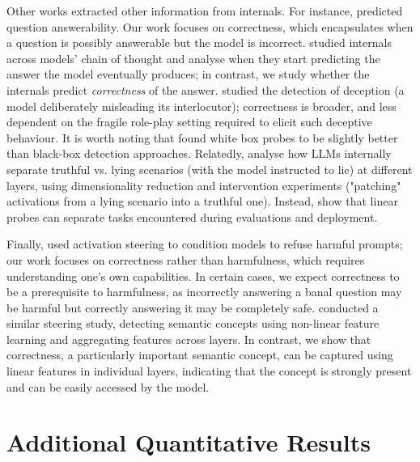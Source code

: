 \documentclass{article} %
\begin{document}
Other works extracted other information from internals. For instance, \cite{heindrich2025sparse}  predicted question answerability. %
Our work focuses on correctness, which encapsulates when a question is possibly answerable but the model is incorrect. %
\cite{Kudo2024ThinktoTalkOT} %
studied internals across models' chain of thought  and analyse when they start predicting the answer the model eventually produces; in contrast, we study whether the internals predict \textit{correctness} of the answer.
\cite{goldowsky2025detecting} studied the detection of deception (a model deliberately misleading its interlocutor); correctness is broader, and less dependent on the fragile role-play setting required to elicit such deceptive behaviour. It is worth noting that \cite{parrack2025benchmarking} found white box probes to be slightly better than black-box detection approaches. Relatedly, \cite{yang2024interpretability} analyse how LLMs internally separate truthful vs. lying scenarios (with the model instructed to lie) at different layers, using dimensionality reduction and intervention experiments ("patching" activations from a lying scenario into a truthful one). %
Instead, \citep{nguyen2025probing} show that linear probes can separate tasks encountered during evaluations and deployment.

Finally, \cite{lee2025programming} used activation steering to condition models to refuse harmful prompts; our work focuses on correctness rather than harmfulness, which requires understanding one's own capabilities. In certain cases, we expect correctness to be a prerequisite to harmfulness, as incorrectly answering a banal question may be harmful but correctly answering it may be completely safe. \cite{beaglehole2025aggregate} conducted a similar steering study, detecting semantic concepts using non-linear feature learning and aggregating features across layers. In contrast, we show that correctness, a particularly important semantic concept, can be captured using linear features in individual layers, indicating that the concept is strongly present and can be easily accessed by the model. %


\section{Additional Quantitative Results}
\end{document}

